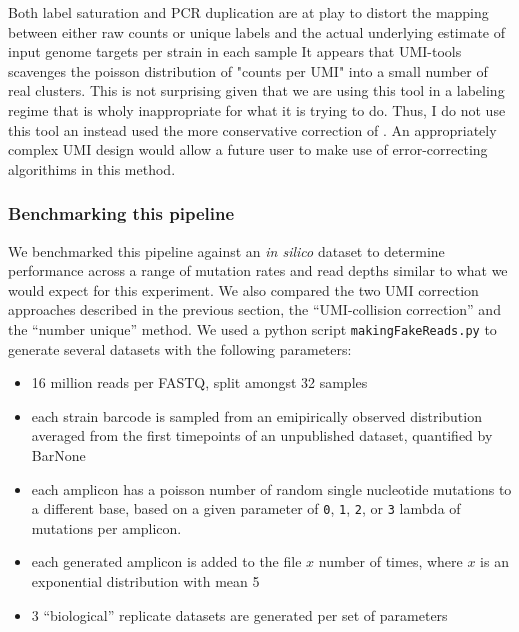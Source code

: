 
Both label saturation and PCR duplication
are at play to distort the mapping between either raw counts or unique
labels and the actual underlying estimate of input genome targets per
strain in each sample
It appears that UMI-tools scavenges the poisson distribution of
"counts per UMI" into a small number of real clusters. This is not
surprising given that we are using this tool in a labeling regime that
is wholy inappropriate for what it is trying to do. Thus, I do not use
this tool an instead used the more conservative 
correction of \cite{fu2011counting}.
An appropriately complex UMI design would allow a future user to make
use of error-correcting algorithims in this method.

\subsubsection{Benchmarking this pipeline}

We benchmarked this pipeline against an \emph{in silico} dataset to
determine performance across a range of mutation rates and read depths
similar to what we would expect for this experiment. We also compared
the two UMI correction approaches described in the previous section, the
``UMI-collision correction'' and the ``number unique'' method. We used a
python script \texttt{makingFakeReads.py} to generate several datasets
with the following parameters:

\begin{itemize}
  \setlength\itemsep{0em}
  \item
  16 million reads per FASTQ, split amongst 32 samples
  \item
  each strain barcode is sampled from an emipirically observed
  distribution averaged from the first timepoints of an unpublished
  dataset, quantified by BarNone
  \item
  each amplicon has a poisson number of random single nucleotide
  mutations to a different base, based on a given parameter of
  \texttt{0}, \texttt{1}, \texttt{2}, or \texttt{3} lambda of mutations
  per amplicon.
  \item
  each generated amplicon is added to the file \(x\) number of times,
  where \(x\) is an exponential distribution with mean 5
  \item
  3 ``biological'' replicate datasets are generated per set of
  parameters
\end{itemize}

